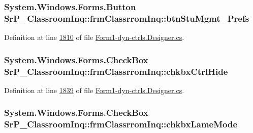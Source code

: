 \hypertarget{class_sr_p___classroom_inq_1_1frm_classrrom_inq_af14017019a644ec6c1d32d49fb0e59f1}{
\subsubsection[{btn\-Stu\-Mgmt\-\_\-\-Prefs}]{\setlength{\rightskip}{0pt plus 5cm}\-System.\-Windows.\-Forms.\-Button {\bf \-Sr\-P\-\_\-\-Classroom\-Inq\-::frm\-Classrrom\-Inq\-::btn\-Stu\-Mgmt\-\_\-\-Prefs}}}
\label{class_sr_p___classroom_inq_1_1frm_classrrom_inq_af14017019a644ec6c1d32d49fb0e59f1}


\-Definition at line \hyperlink{_form1-dyn-ctrls_8_designer_8cs_source_l01810}{1810} of file \hyperlink{_form1-dyn-ctrls_8_designer_8cs_source}{\-Form1-\/dyn-\/ctrls.\-Designer.\-cs}.

\hypertarget{class_sr_p___classroom_inq_1_1frm_classrrom_inq_a65b5726e5b2299abee70eba1a67b6ea3}{
\subsubsection[{chkbx\-Ctrl\-Hide}]{\setlength{\rightskip}{0pt plus 5cm}\-System.\-Windows.\-Forms.\-Check\-Box {\bf \-Sr\-P\-\_\-\-Classroom\-Inq\-::frm\-Classrrom\-Inq\-::chkbx\-Ctrl\-Hide}}}
\label{class_sr_p___classroom_inq_1_1frm_classrrom_inq_a65b5726e5b2299abee70eba1a67b6ea3}


\-Definition at line \hyperlink{_form1-dyn-ctrls_8_designer_8cs_source_l01839}{1839} of file \hyperlink{_form1-dyn-ctrls_8_designer_8cs_source}{\-Form1-\/dyn-\/ctrls.\-Designer.\-cs}.

\hypertarget{class_sr_p___classroom_inq_1_1frm_classrrom_inq_ae2a9d3b663f7c88374a93c3cd9ef6eca}{
\subsubsection[{chkbx\-Lame\-Mode}]{\setlength{\rightskip}{0pt plus 5cm}\-System.\-Windows.\-Forms.\-Check\-Box {\bf \-Sr\-P\-\_\-\-Classroom\-Inq\-::frm\-Classrrom\-Inq\-::chkbx\-Lame\-Mode}}}
\label{class_sr_p___classroom_inq_1_1frm_classrrom_inq_ae2a9d3b663f7c88374a93c3cd9ef6eca}


